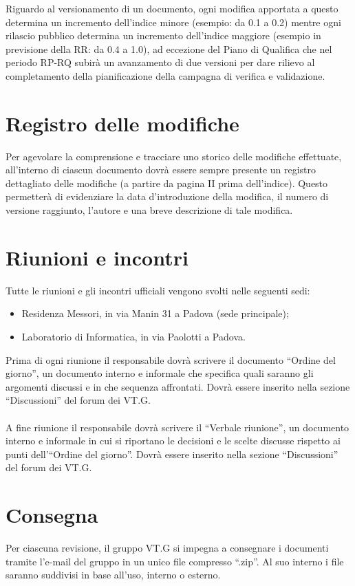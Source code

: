Riguardo al versionamento di un documento, ogni modifica apportata a questo
determina un incremento dell'indice minore (esempio: da 0.1 a 0.2) mentre ogni
rilascio pubblico determina un incremento dell'indice maggiore (esempio in
previsione della RR: da 0.4 a 1.0), ad eccezione del Piano di Qualifica che
nel periodo RP-RQ subir\`a un avanzamento di due versioni per dare rilievo al
completamento della pianificazione della campagna di verifica e validazione.


\chapter{Registro delle modifiche}
\thispagestyle{fancy}
Per agevolare la comprensione e tracciare uno storico delle modifiche
effettuate, all'interno di ciascun documento dovr\`a essere sempre
presente un registro dettagliato delle modifiche (a partire da
pagina II prima dell'indice). Questo permetter\`a di evidenziare la data
d'introduzione della modifica, il numero di versione raggiunto, l'autore e una
breve descrizione di tale modifica.


\chapter{Riunioni e incontri}
\thispagestyle{fancy}
Tutte le riunioni e gli incontri ufficiali vengono svolti nelle seguenti sedi:

\begin{itemize}
\item Residenza Messori, in via Manin 31 a Padova (sede principale);
\item Laboratorio di Informatica, in via Paolotti a Padova.
\end{itemize}

Prima di ogni riunione il responsabile dovr\`a scrivere il documento
``Ordine del giorno'', un documento interno e informale che specifica quali saranno gli
argomenti discussi e in che sequenza affrontati. Dovr\`a essere inserito nella
sezione ``Discussioni'' del forum dei VT.G. \\ \\
A fine riunione il responsabile dovr\`a scrivere il ``Verbale riunione'', un
documento interno e informale in cui si riportano le decisioni e le scelte
discusse rispetto ai punti dell'``Ordine del giorno''. Dovr\`a essere inserito
nella sezione ``Discussioni'' del forum dei VT.G.

\chapter{Consegna}
\thispagestyle{fancy}
Per ciascuna revisione, il gruppo VT.G si impegna a consegnare i documenti
tramite l'e-mail del gruppo in un unico file compresso ``.zip''. Al suo interno i
file saranno suddivisi in base all'uso, interno o esterno.

\listoffigures
{}
